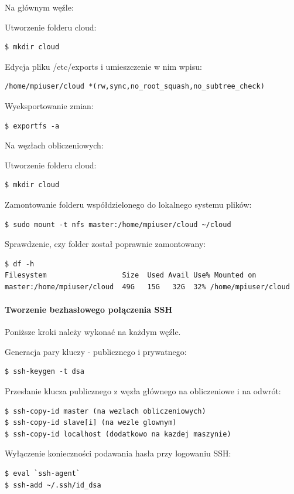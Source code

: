 \documentclass{article}
\begin{document}
Na głównym węźle:

Utworzenie folderu cloud:
\begin{lstlisting}
$ mkdir cloud
\end{lstlisting}

Edycja pliku /etc/exports i umieszczenie w nim wpisu:
\begin{lstlisting}
/home/mpiuser/cloud *(rw,sync,no_root_squash,no_subtree_check)
\end{lstlisting}

Wyeksportowanie zmian:

\begin{lstlisting}
$ exportfs -a
\end{lstlisting}
\newpage
Na węzłach obliczeniowych:

Utworzenie folderu cloud:
\begin{lstlisting}
$ mkdir cloud
\end{lstlisting}

Zamontowanie folderu współdzielonego do lokalnego systemu plików:
\begin{lstlisting}
$ sudo mount -t nfs master:/home/mpiuser/cloud ~/cloud
\end{lstlisting}

Sprawdzenie, czy folder został poprawnie zamontowany:
\begin{lstlisting}
$ df -h
Filesystem                  Size  Used Avail Use% Mounted on
master:/home/mpiuser/cloud  49G   15G   32G  32% /home/mpiuser/cloud
\end{lstlisting}

\paragraph{Tworzenie bezhasłowego połączenia SSH}
Poniższe kroki należy wykonać na każdym węźle.

Generacja pary kluczy - publicznego i prywatnego:
\begin{lstlisting}
$ ssh-keygen -t dsa
\end{lstlisting}

Przesłanie klucza publicznego z węzła głównego na obliczeniowe i na odwrót:
\begin{lstlisting}
$ ssh-copy-id master (na wezlach obliczeniowych)
$ ssh-copy-id slave[i] (na wezle glownym)
$ ssh-copy-id localhost (dodatkowo na kazdej maszynie)
\end{lstlisting}

Wyłączenie konieczności podawania hasła przy logowaniu SSH:
\begin{lstlisting}
$ eval `ssh-agent`
$ ssh-add ~/.ssh/id_dsa
\end{lstlisting}
\end{document}
